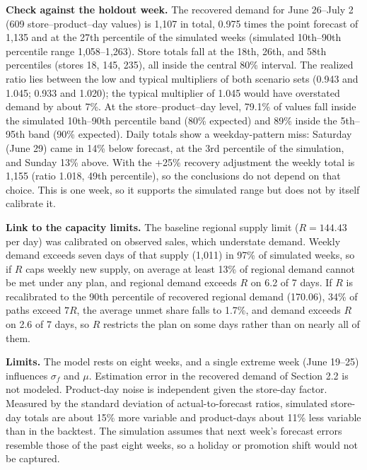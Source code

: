 \textbf{Check against the holdout week.} The recovered demand for June 26--July 2 (609 store--product--day values) is 1{,}107 in total, 0.975 times the point forecast of 1{,}135 and at the 27th percentile of the simulated weeks (simulated 10th--90th percentile range 1{,}058--1{,}263). Store totals fall at the 18th, 26th, and 58th percentiles (stores 18, 145, 235), all inside the central 80\% interval. The realized ratio lies between the low and typical multipliers of both scenario sets (0.943 and 1.045; 0.933 and 1.020); the typical multiplier of 1.045 would have overstated demand by about 7\%. At the store--product--day level, 79.1\% of values fall inside the simulated 10th--90th percentile band (80\% expected) and 89\% inside the 5th--95th band (90\% expected). Daily totals show a weekday-pattern miss: Saturday (June 29) came in 14\% below forecast, at the 3rd percentile of the simulation, and Sunday 13\% above. With the +25\% recovery adjustment the weekly total is 1{,}155 (ratio 1.018, 49th percentile), so the conclusions do not depend on that choice. This is one week, so it supports the simulated range but does not by itself calibrate it.

\textbf{Link to the capacity limits.} The baseline regional supply limit ($R=144.43$ per day) was calibrated on observed sales, which understate demand. Weekly demand exceeds seven days of that supply (1{,}011) in 97\% of simulated weeks, so if $R$ caps weekly new supply, on average at least 13\% of regional demand cannot be met under any plan, and regional demand exceeds $R$ on 6.2 of 7 days. If $R$ is recalibrated to the 90th percentile of recovered regional demand (170.06), 34\% of paths exceed $7R$, the average unmet share falls to 1.7\%, and demand exceeds $R$ on 2.6 of 7 days, so $R$ restricts the plan on some days rather than on nearly all of them.

\textbf{Limits.} The model rests on eight weeks, and a single extreme week (June 19--25) influences $\sigma_f$ and $\mu$. Estimation error in the recovered demand of Section 2.2 is not modeled. Product-day noise is independent given the store-day factor. Measured by the standard deviation of actual-to-forecast ratios, simulated store-day totals are about 15\% more variable and product-days about 11\% less variable than in the backtest. The simulation assumes that next week's forecast errors resemble those of the past eight weeks, so a holiday or promotion shift would not be captured.
